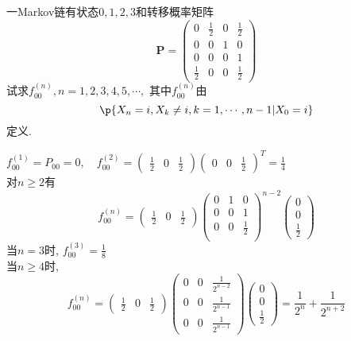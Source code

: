 \begin{problem}{3.11}
一Markov链有状态$0,1,2,3$和转移概率矩阵
\[
	\bm{P} =
	\begin{pmatrix}
		0           & \frac{1}{2} & 0 & \frac{1}{2} \\
		0           & 0           & 1 & 0           \\
		0           & 0           & 0 & 1           \\
		\frac{1}{2} & 0           & 0 & \frac{1}{2}
	\end{pmatrix}
\]
试求$f^{(n)}_{00}, n = 1,2,3,4,5,\cdots, $ 其中$f^{(n)}_{00}$由
\[\p\{X_n = i, X_k \neq i, k = 1, \cdots, n-1 | X_0 = i\}\]定义.
\end{problem}
\begin{solution}
	$f^{(1)}_{00} = P_{00} = 0,\quad f^{(2)}_{00} = \begin{pmatrix}\frac{1}{2} & 0 & \frac{1}{2}\end{pmatrix}\begin{pmatrix}0 & 0 & \frac{1}{2}\end{pmatrix}^T = \frac{1}{4}$ \\
	对$n \geqslant 2$有
	\[f^{(n)}_{00} =
		\begin{pmatrix}\frac{1}{2} & 0 & \frac{1}{2}\end{pmatrix}
		\begin{pmatrix}
			0 & 1 & 0           \\
			0 & 0 & 1           \\
			0 & 0 & \frac{1}{2} \\
		\end{pmatrix}^{n-2}
		\begin{pmatrix}0 \\ 0 \\ \frac{1}{2}\end{pmatrix}
	\]
	当$n=3$时, $f^{(3)}_{00} = \frac{1}{8}$\\
	当$n \geqslant 4$时,
	\[f^{(n)}_{00} =
		\begin{pmatrix}\frac{1}{2} & 0 & \frac{1}{2}\end{pmatrix}
		\begin{pmatrix}
			0 & 0 & \frac{1}{2^{n-2}} \\
			0 & 0 & \frac{1}{2^{n-1}} \\
			0 & 0 & \frac{1}{2^{n-1}}
		\end{pmatrix}
		\begin{pmatrix}0 \\ 0 \\ \frac{1}{2}\end{pmatrix}
		= \frac{1}{2^n} + \frac{1}{2^{n+2}}
	\]
\end{solution}

